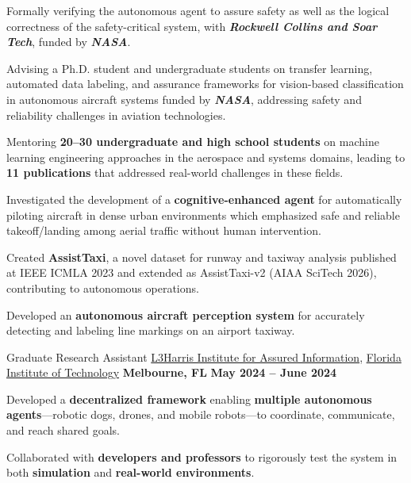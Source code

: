 \begin{cventries}
{\begin{cvitems}
\item Formally verifying the autonomous agent to assure safety as well as the logical correctness of the safety-critical system, with \textit{\textbf{Rockwell Collins and Soar Tech}}, funded by \textit{\textbf{NASA}}.
\item Advising a Ph.D. student and undergraduate students on transfer learning, automated data labeling, and assurance frameworks for vision-based classification in autonomous aircraft systems funded by \textit{\textbf{NASA}}, addressing safety and reliability challenges in aviation technologies.
\item Mentoring \textbf{20--30 undergraduate and high school students} on machine learning engineering approaches in the aerospace and systems domains, leading to \textbf{11 publications} that addressed real-world challenges in these fields.
\item Investigated the development of a \textbf{cognitive-enhanced agent} for automatically piloting aircraft in dense urban environments which emphasized safe and reliable takeoff/landing among aerial traffic without human intervention.
\item Created \textbf{AssistTaxi}, a novel dataset for runway and taxiway analysis published at IEEE ICMLA 2023 and extended as AssistTaxi-v2 (AIAA SciTech 2026), contributing to autonomous operations.
\item Developed an \textbf{autonomous aircraft perception system} for accurately detecting and labeling line markings on an airport taxiway.
\end{cvitems}
}

\cventry
{Graduate Research Assistant}
{\href{https://research.fit.edu/l3hiai/}{L3Harris Institute for Assured Information}, \href{https://www.fit.edu}{Florida Institute of Technology}}
{\textbf{Melbourne, FL}}
{\textbf{May 2024 – June 2024}}
{
\begin{cvitems}
\item Developed a \textbf{decentralized framework} enabling \textbf{multiple autonomous agents}—robotic dogs, drones, and mobile robots—to coordinate, communicate, and reach shared goals.
\item Collaborated with \textbf{developers and professors} to rigorously test the system in both \textbf{simulation} and \textbf{real-world environments}.
\end{cvitems}
}


\end{cventries}
